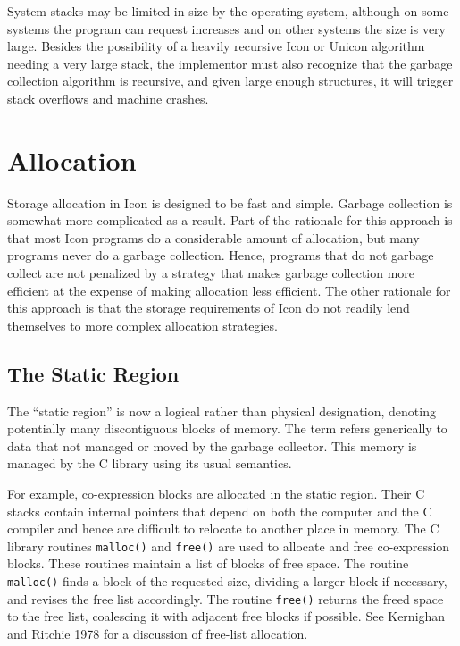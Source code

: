 System stacks may be limited in size by the operating system, although on
some systems the program can request increases and on other systems
the size is very large. Besides the possibility of a heavily recursive
Icon or Unicon algorithm needing a very large stack, the implementor
must also recognize that the garbage collection algorithm is
recursive, and given large enough structures, it will trigger stack
overflows and machine crashes.

\section{Allocation}

Storage allocation in Icon is designed to be fast and simple. Garbage
collection is somewhat more complicated as a result. Part of the
rationale for this approach is that most Icon programs do a
considerable amount of allocation, but many programs never do a
garbage collection. Hence, programs that do not garbage collect are
not penalized by a strategy that makes garbage collection more
efficient at the expense of making allocation less efficient. The
other rationale for this approach is that the storage requirements of
Icon do not readily lend themselves to more complex allocation
strategies.

\subsection{The Static Region}

The ``static region'' is now a logical rather than physical
designation, denoting potentially many discontiguous blocks of memory.
The term refers generically to data that not managed or moved
by the garbage collector. This memory is managed by the C library
using its usual semantics.

For example, co-expression blocks are allocated in the static
region. Their C stacks contain internal pointers that depend on
both the computer and the C compiler and hence are difficult to
relocate to another place in memory.
The C library routines \texttt{malloc()} and \texttt{free()} are used
to allocate and free co-expression blocks. These
routines maintain a list of blocks of free space. The routine
\texttt{malloc()} finds a block of the requested size, dividing a
larger block if necessary, and revises the free list accordingly. The
routine \texttt{free()} returns the freed space to the free list,
coalescing it with adjacent free blocks if possible. See Kernighan and
Ritchie 1978 for a discussion of free-list allocation.



